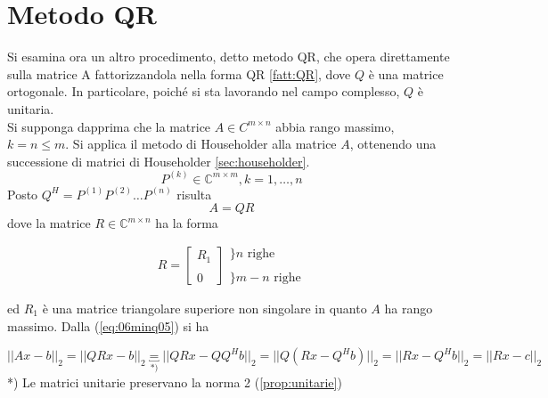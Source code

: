 \section{Metodo QR} 
Si esamina ora un altro procedimento, detto metodo QR, che opera
direttamente sulla matrice A fattorizzandola nella forma QR
\ref{fatt:QR}, dove $Q$ \`e una matrice ortogonale.  In particolare,
poich\'e si sta lavorando nel campo complesso, $Q$ \`e unitaria. \\
Si supponga dapprima che la matrice $A \in C^{m\times n} $ abbia rango
massimo, $k = n \leq m$.  Si applica il metodo di Householder alla
matrice $A$, ottenendo una successione di matrici di Householder 
\ref{sec:householder}.
$$ P^{(k)} \in \mathbb{C}^{m \times m }, k =1, \ldots, n$$
Posto $Q^{H} = P^{(1)} P^{(2)}\ldots P^{(n)}$ risulta
\begin{equation}
  \label{eq:06minq05} A=QR
\end{equation} 
dove la matrice $R \in \mathbb{C}^{m \times n}$ ha la forma

\begin{equation}
  \label{eq:06minq06} R = \left[
\begin{array}{l} R_1 \\ \\ 0
\end{array} \right]
\begin{array}{l} \}n \text{ righe} \\ \\ \}m-n \text{ righe}
\end{array}
\end{equation}

ed $R_1$ \`e una matrice triangolare superiore non singolare in quanto
$A$ ha rango massimo. Dalla (\ref{eq:06minq05}) si ha

\begin{equation}
  \label{eq:06minq07} 
  || Ax - b ||_2 = ||QRx - b||_2 \underbracket{=}_{*)} 
  ||QRx - QQ^{H}b||_2 = ||Q(Rx - Q^{H}b)||_2 = ||Rx - Q^{H}b||_2 = 
  ||Rx - c||_2
\end{equation}
*) Le matrici unitarie preservano la norma 2 (\ref{prop:unitarie})\\

